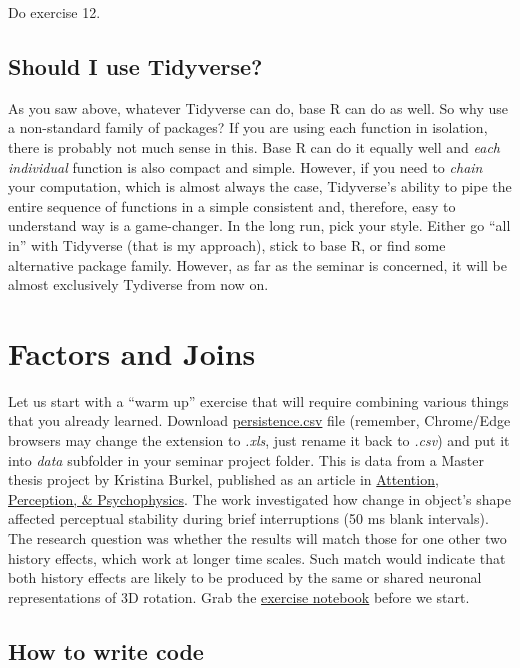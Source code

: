 \documentclass[
]{book}
\begin{document}
Do exercise 12.

\hypertarget{should-i-use-tidyverse}{%
\section{Should I use Tidyverse?}\label{should-i-use-tidyverse}}

As you saw above, whatever Tidyverse can do, base R can do as well. So why use a non-standard family of packages? If you are using each function in isolation, there is probably not much sense in this. Base R can do it equally well and \emph{each individual} function is also compact and simple. However, if you need to \emph{chain} your computation, which is almost always the case, Tidyverse's ability to pipe the entire sequence of functions in a simple consistent and, therefore, easy to understand way is a game-changer. In the long run, pick your style. Either go ``all in'' with Tidyverse (that is my approach), stick to base R, or find some alternative package family. However, as far as the seminar is concerned, it will be almost exclusively Tydiverse from now on.

\hypertarget{seminar07}{%
\chapter{Factors and Joins}\label{seminar07}}

Let us start with a ``warm up'' exercise that will require combining various things that you already learned. Download \href{data/persistence.csv}{persistence.csv} file (remember, Chrome/Edge browsers may change the extension to \emph{.xls}, just rename it back to \emph{.csv}) and put it into \emph{data} subfolder in your seminar project folder. This is data from a Master thesis project by Kristina Burkel, published as an article in \href{http://link.springer.com/10.3758/s13414-019-01954-7}{Attention, Perception, \& Psychophysics}. The work investigated how change in object's shape affected perceptual stability during brief interruptions (50 ms blank intervals). The research question was whether the results will match those for one other two history effects, which work at longer time scales. Such match would indicate that both history effects are likely to be produced by the same or shared neuronal representations of 3D rotation. Grab the \href{notebooks/Seminar\%2007.Rmd}{exercise notebook} before we start.

\hypertarget{how-to-write-code}{%
\section{How to write code}\label{how-to-write-code}}
\end{document}
